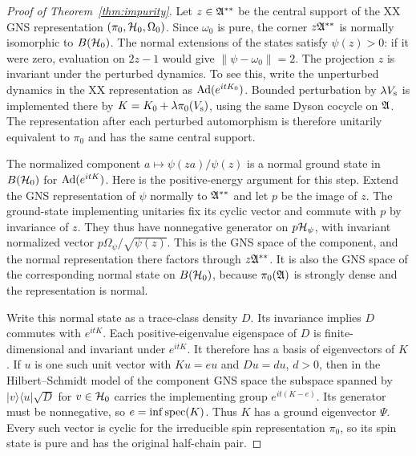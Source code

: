 \begin{proof}[Proof of Theorem~\ref{thm:impurity}]
Let $z\in\mathfrak A^{**}$ be the central support of the XX GNS representation
$(\pi_0,\mathcal H_0,\Omega_0)$. Since $\omega_0$ is pure, the corner $z\mathfrak A^{**}$ is
normally isomorphic to $B(\mathcal H_0)$. The normal extensions of the states
satisfy $\psi(z)>0$: if it were zero, evaluation on $2z-1$ would give
$\|\psi-\omega_0\|=2$. The projection $z$ is invariant under the perturbed
dynamics. To see this, write the unperturbed dynamics in the XX representation
as $\operatorname{Ad}(e^{itK_0})$. Bounded perturbation by $\lambda V_{\rm s}$ is implemented
there by $K=K_0+\lambda\pi_0(V_{\rm s})$, using the same Dyson cocycle on
$\mathfrak A$. The representation after each perturbed automorphism is therefore
unitarily equivalent to $\pi_0$ and has the same central support.

The normalized component $a\mapsto\psi(za)/\psi(z)$ is a normal ground
state in $B(\mathcal H_0)$ for $\operatorname{Ad}(e^{itK})$. Here is the positive-energy argument
for this step. Extend the GNS representation of $\psi$ normally to $\mathfrak A^{**}$
and let $p$ be the image of $z$. The ground-state implementing unitaries
fix its cyclic vector and commute with $p$ by invariance of $z$. They thus
have nonnegative generator on $p\mathcal H_\psi$, with invariant normalized vector
$p\Omega_\psi/\sqrt{\psi(z)}$. This is the GNS space of the component,
and the normal representation there factors through $z\mathfrak A^{**}$. It is also
the GNS space of the corresponding normal state on $B(\mathcal H_0)$, because
$\pi_0(\mathfrak A)$ is strongly dense and the representation is normal.

Write this normal state as a trace-class density $D$. Its invariance implies
$D$ commutes with $e^{itK}$. Each positive-eigenvalue eigenspace of $D$ is
finite-dimensional and invariant under $e^{itK}$. It therefore has a basis
of eigenvectors of $K$. If $u$ is one such unit vector with $Ku=eu$ and
$Du=d u$, $d>0$, then in the Hilbert--Schmidt model of the component GNS
space the subspace spanned by $|v\rangle\langle u|\sqrt D$ for $v\in\mathcal H_0$
carries the implementing group $e^{it(K-e)}$. Its generator must be
nonnegative, so $e=\inf\operatorname{spec}(K)$. Thus $K$ has a ground eigenvector $\Psi$.
Every such vector is cyclic for the irreducible spin representation
$\pi_0$, so its spin state is pure and has the original half-chain pair.


\end{proof}
